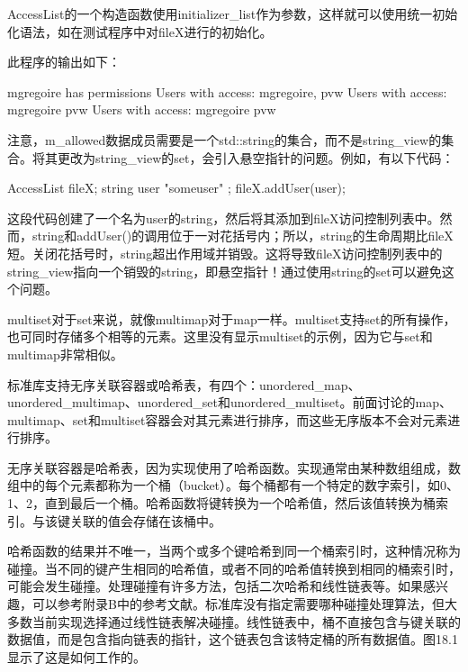 AccessList的一个构造函数使用initializer\_list作为参数，这样就可以使用统一初始化语法，如在测试程序中对fileX进行的初始化。

此程序的输出如下：

\begin{shell}
mgregoire has permissions
Users with access: mgregoire, pvw
Users with access: mgregoire pvw
Users with access: mgregoire pvw
\end{shell}

注意，m\_allowed数据成员需要是一个std::string的集合，而不是string\_view的集合。将其更改为string\_view的set，会引入悬空指针的问题。例如，有以下代码：

\begin{cpp}
AccessList fileX;
{
    string user { "someuser" };
    fileX.addUser(user);
}
\end{cpp}

这段代码创建了一个名为user的string，然后将其添加到fileX访问控制列表中。然而，string和addUser()的调用位于一对花括号内；所以，string的生命周期比fileX短。关闭花括号时，string超出作用域并销毁。这将导致fileX访问控制列表中的string\_view指向一个销毁的string，即悬空指针！通过使用string的set可以避免这个问题。


multiset对于set来说，就像multimap对于map一样。multiset支持set的所有操作，也可同时存储多个相等的元素。这里没有显示multiset的示例，因为它与set和multimap非常相似。


标准库支持无序关联容器或哈希表，有四个：unordered\_map、unordered\_multimap、unordered\_set和unordered\_multiset。前面讨论的map、multimap、set和multiset容器会对其元素进行排序，而这些无序版本不会对元素进行排序。


无序关联容器是哈希表，因为实现使用了哈希函数。实现通常由某种数组组成，数组中的每个元素都称为一个桶（bucket）。每个桶都有一个特定的数字索引，如0、1、2，直到最后一个桶。哈希函数将键转换为一个哈希值，然后该值转换为桶索引。与该键关联的值会存储在该桶中。

哈希函数的结果并不唯一，当两个或多个键哈希到同一个桶索引时，这种情况称为碰撞。当不同的键产生相同的哈希值，或者不同的哈希值转换到相同的桶索引时，可能会发生碰撞。处理碰撞有许多方法，包括二次哈希和线性链表等。如果感兴趣，可以参考附录B中的参考文献。标准库没有指定需要哪种碰撞处理算法，但大多数当前实现选择通过线性链表解决碰撞。线性链表中，桶不直接包含与键关联的数据值，而是包含指向链表的指针，这个链表包含该特定桶的所有数据值。图18.1显示了这是如何工作的。

